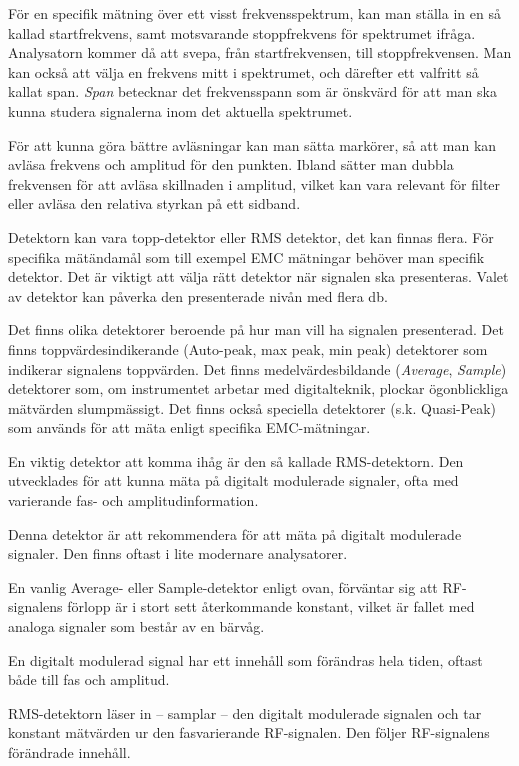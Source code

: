 För en specifik mätning över ett visst frekvensspektrum, kan man ställa in en
så kallad startfrekvens, samt motsvarande stoppfrekvens för spektrumet ifråga.
Analysatorn kommer då att svepa, från startfrekvensen, till stoppfrekvensen.
Man kan också att välja en frekvens mitt i spektrumet, och därefter ett
valfritt så kallat span.
\emph{Span} betecknar det frekvensspann som är önskvärd för att man ska
kunna studera signalerna inom det aktuella spektrumet.

För att kunna göra bättre avläsningar kan man sätta markörer, så att man kan
avläsa frekvens och amplitud för den punkten.
Ibland sätter man dubbla frekvensen för att avläsa skillnaden i amplitud,
vilket kan vara relevant för filter eller avläsa den relativa styrkan på ett
sidband.

Detektorn kan vara topp-detektor eller RMS detektor, det kan finnas flera.
För specifika mätändamål som till exempel EMC mätningar behöver man specifik
detektor.
Det är viktigt att välja rätt detektor när signalen ska presenteras.
Valet av detektor kan påverka den presenterade nivån med flera \unit{\decibel}.

Det finns olika detektorer beroende på hur man vill ha signalen presenterad.
Det finns toppvärdesindikerande (Auto-peak, max peak, min peak) detektorer som
indikerar signalens toppvärden.
Det finns medelvärdesbildande (\emph{Average}, \emph{Sample}) detektorer som, om
instrumentet arbetar med digitalteknik, plockar ögonblickliga mätvärden
slumpmässigt.
Det finns också speciella detektorer (s.k. Quasi-Peak) som används för att
mäta enligt specifika EMC-mätningar.

En viktig detektor att komma ihåg är den så kallade RMS-detektorn.
Den utvecklades för att kunna mäta på digitalt modulerade signaler, ofta med
varierande fas- och amplitudinformation.

Denna detektor är att rekommendera för att mäta på digitalt modulerade signaler.
Den finns oftast i lite modernare analysatorer.

En vanlig Average- eller Sample-detektor enligt ovan, förväntar sig att
RF-signalens förlopp är i stort sett återkommande konstant, vilket är fallet
med analoga signaler som består av en bärvåg.

En digitalt modulerad signal har ett innehåll som förändras hela tiden, oftast
både till fas och amplitud.

RMS-detektorn läser in -- samplar -- den digitalt modulerade signalen och tar
konstant mätvärden ur den fasvarierande RF-signalen.
Den följer RF-signalens förändrade innehåll.

